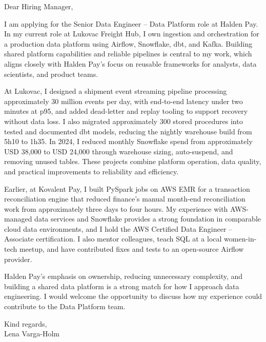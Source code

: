 \documentclass[11pt,a4paper]{article}
\begin{document}
Dear Hiring Manager,

I am applying for the Senior Data Engineer – Data Platform role at Halden Pay. In my current role at Lukovac Freight Hub, I own ingestion and orchestration for a production data platform using Airflow, Snowflake, dbt, and Kafka. Building shared platform capabilities and reliable pipelines is central to my work, which aligns closely with Halden Pay’s focus on reusable frameworks for analysts, data scientists, and product teams.

At Lukovac, I designed a shipment event streaming pipeline processing approximately 30 million events per day, with end-to-end latency under two minutes at p95, and added dead-letter and replay tooling to support recovery without data loss. I also migrated approximately 300 stored procedures into tested and documented dbt models, reducing the nightly warehouse build from 5h10 to 1h35. In 2024, I reduced monthly Snowflake spend from approximately USD 38,000 to USD 24,000 through warehouse sizing, auto-suspend, and removing unused tables. These projects combine platform operation, data quality, and practical improvements to reliability and efficiency.

Earlier, at Kovalent Pay, I built PySpark jobs on AWS EMR for a transaction reconciliation engine that reduced finance’s manual month-end reconciliation work from approximately three days to four hours. My experience with AWS-managed data services and Snowflake provides a strong foundation in comparable cloud data environments, and I hold the AWS Certified Data Engineer – Associate certification. I also mentor colleagues, teach SQL at a local women-in-tech meetup, and have contributed fixes and tests to an open-source Airflow provider.

Halden Pay’s emphasis on ownership, reducing unnecessary complexity, and building a shared data platform is a strong match for how I approach data engineering. I would welcome the opportunity to discuss how my experience could contribute to the Data Platform team.

Kind regards,\\
Lena Varga-Holm
\end{document}
